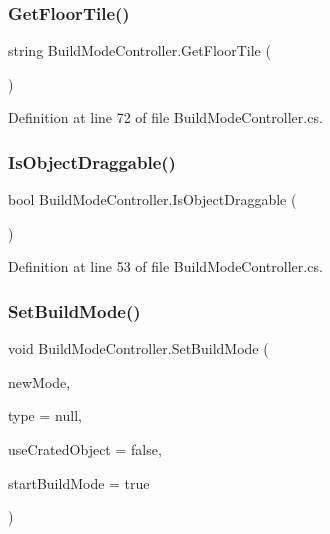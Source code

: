 \subsubsection{\texorpdfstring{Get\+Floor\+Tile()}{GetFloorTile()}}
{\footnotesize\ttfamily string Build\+Mode\+Controller.\+Get\+Floor\+Tile (\begin{DoxyParamCaption}{ }\end{DoxyParamCaption})}



Definition at line 72 of file Build\+Mode\+Controller.\+cs.

\mbox{\label{class_build_mode_controller_afa05334c74ecba755e41508ac035725b}} 
\subsubsection{\texorpdfstring{Is\+Object\+Draggable()}{IsObjectDraggable()}}
{\footnotesize\ttfamily bool Build\+Mode\+Controller.\+Is\+Object\+Draggable (\begin{DoxyParamCaption}{ }\end{DoxyParamCaption})}



Definition at line 53 of file Build\+Mode\+Controller.\+cs.

\mbox{\label{class_build_mode_controller_a0958b997758652d8248fa44c77203ad2}} 
\subsubsection{\texorpdfstring{Set\+Build\+Mode()}{SetBuildMode()}}
{\footnotesize\ttfamily void Build\+Mode\+Controller.\+Set\+Build\+Mode (\begin{DoxyParamCaption}\item[{\hyperlink{_build_mode_controller_8cs_a9c6873c2efeb065f633a16b39a5841bd}{Build\+Mode}}]{new\+Mode,  }\item[{string}]{type = {\ttfamily null},  }\item[{bool}]{use\+Crated\+Object = {\ttfamily false},  }\item[{bool}]{start\+Build\+Mode = {\ttfamily true} }\end{DoxyParamCaption})}



